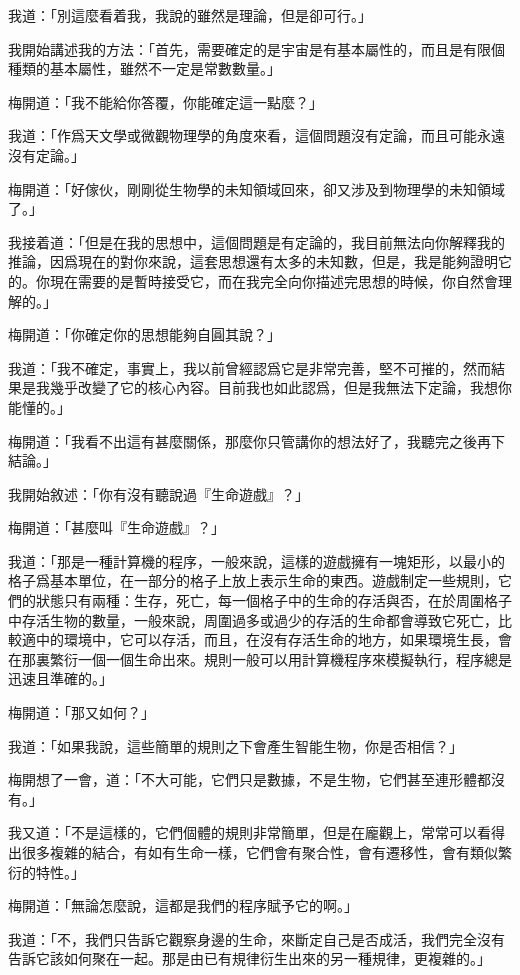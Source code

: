 我道：「別這麼看着我，我說的雖然是理論，但是卻可行。」

我開始講述我的方法：「首先，需要確定的是宇宙是有基本屬性的，而且是有限個種類的基本屬性，雖然不一定是常數數量。」

梅開道：「我不能給你答覆，你能確定這一點麼？」

我道：「作爲天文學或微觀物理學的角度來看，這個問題沒有定論，而且可能永遠沒有定論。」

梅開道：「好傢伙，剛剛從生物學的未知領域回來，卻又涉及到物理學的未知領域了。」

我接着道：「但是在我的思想中，這個問題是有定論的，我目前無法向你解釋我的推論，因爲現在的對你來說，這套思想還有太多的未知數，但是，我是能夠證明它的。你現在需要的是暫時接受它，而在我完全向你描述完思想的時候，你自然會理解的。」

梅開道：「你確定你的思想能夠自圓其說？」

我道：「我不確定，事實上，我以前曾經認爲它是非常完善，堅不可摧的，然而結果是我幾乎改變了它的核心內容。目前我也如此認爲，但是我無法下定論，我想你能懂的。」

梅開道：「我看不出這有甚麼關係，那麼你只管講你的想法好了，我聽完之後再下結論。」

我開始敘述：「你有沒有聽說過『生命遊戲』？」

梅開道：「甚麼叫『生命遊戲』？」

我道：「那是一種計算機的程序，一般來說，這樣的遊戲擁有一塊矩形，以最小的格子爲基本單位，在一部分的格子上放上表示生命的東西。遊戲制定一些規則，它們的狀態只有兩種：生存，死亡，每一個格子中的生命的存活與否，在於周圍格子中存活生物的數量，一般來說，周圍過多或過少的存活的生命都會導致它死亡，比較適中的環境中，它可以存活，而且，在沒有存活生命的地方，如果環境生長，會在那裏繁衍一個一個生命出來。規則一般可以用計算機程序來模擬執行，程序總是迅速且準確的。」


梅開道：「那又如何？」

我道：「如果我說，這些簡單的規則之下會產生智能生物，你是否相信？」

梅開想了一會，道：「不大可能，它們只是數據，不是生物，它們甚至連形體都沒有。」

我又道：「不是這樣的，它們個體的規則非常簡單，但是在龐觀上，常常可以看得出很多複雜的結合，有如有生命一樣，它們會有聚合性，會有遷移性，會有類似繁衍的特性。」

梅開道：「無論怎麼說，這都是我們的程序賦予它的啊。」

我道：「不，我們只告訴它觀察身邊的生命，來斷定自己是否成活，我們完全沒有告訴它該如何聚在一起。那是由已有規律衍生出來的另一種規律，更複雜的。」

